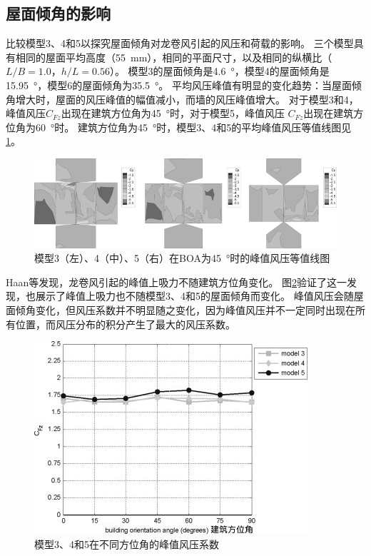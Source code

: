 \documentclass{ctexart}
\begin{document}
\subsection{屋面倾角的影响}
比较模型3、4和5以探究屋面倾角对龙卷风引起的风压和荷载的影响。
三个模型具有相同的屋面平均高度（\SI{55}{mm}），相同的平面尺寸，以及相同的纵横比（$L/B=1.0$，$h/L=0.56$）。
模型3的屋面倾角是\SI{4.6}{\degree}，模型4的屋面倾角是\SI{15.95}{\degree}，模型6的屋面倾角为\SI{35.5}{\degree}。
平均风压峰值有明显的变化趋势：当屋面倾角增大时，屋面的风压峰值的幅值减小，而墙的风压峰值增大。
对于模型3和4，峰值风压$C_{Fz}$出现在建筑方位角为\SI{45}{\degree}时，对于模型5，峰值风压 $C_{Fz}$出现在建筑方位角为\SI{60}{\degree}时。
建筑方位角为\SI{45}{\degree}时，模型3、4和5的平均峰值风压等值线图见\ref{fig:p-pitch}。
\begin{figure}[h]
\centering
\includegraphics{./fig/7.jpg}
\caption{模型3（左）、4（中）、5（右）在BOA为\SI{45}{\degree}时的峰值风压等值线图}
\label{fig:p-pitch}
\end{figure}

Haan等\cite{haan2009tornado}发现，龙卷风引起的峰值上吸力不随建筑方位角变化。
图\ref{fig:uplift}验证了这一发现，也展示了峰值上吸力也不随模型3、4和5的屋面倾角而变化。
峰值风压会随屋面倾角变化，但风压系数并不明显随之变化，因为峰值风压并不一定同时出现在所有位置，而风压分布的积分产生了最大的风压系数。
\begin{figure}[h]
\centering
\includegraphics{./fig/8.jpg}
\caption{模型3、4和5在不同方位角的峰值风压系数}
\label{fig:uplift}
\end{figure}
\end{document}
